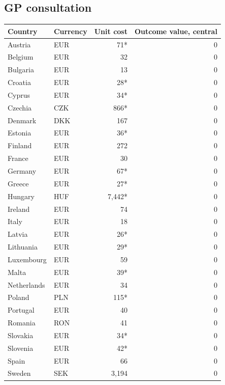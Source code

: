 \subsection*{GP consultation}
\begin{longtable}{llrr}
\toprule
Country & Currency & Unit cost & Outcome value, central \\
\midrule
\endhead
Austria & EUR & 71* & 0 \\
Belgium & EUR & 32 & 0 \\
Bulgaria & EUR & 13 & 0 \\
Croatia & EUR & 28* & 0 \\
Cyprus & EUR & 34* & 0 \\
Czechia & CZK & 866* & 0 \\
Denmark & DKK & 167 & 0 \\
Estonia & EUR & 36* & 0 \\
Finland & EUR & 272 & 0 \\
France & EUR & 30 & 0 \\
Germany & EUR & 67* & 0 \\
Greece & EUR & 27* & 0 \\
Hungary & HUF & 7,442* & 0 \\
Ireland & EUR & 74 & 0 \\
Italy & EUR & 18 & 0 \\
Latvia & EUR & 26* & 0 \\
Lithuania & EUR & 29* & 0 \\
Luxembourg & EUR & 59 & 0 \\
Malta & EUR & 39* & 0 \\
Netherlands & EUR & 34 & 0 \\
Poland & PLN & 115* & 0 \\
Portugal & EUR & 40 & 0 \\
Romania & RON & 41 & 0 \\
Slovakia & EUR & 34* & 0 \\
Slovenia & EUR & 42* & 0 \\
Spain & EUR & 66 & 0 \\
Sweden & SEK & 3,194 & 0 \\
\bottomrule
\end{longtable}
